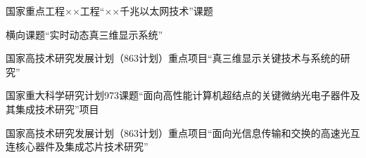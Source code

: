 \begin{resume2}

  \begin{enumerate}[{[}1{]}]
  \addtolength{\itemsep}{-.36\baselineskip}%
  \item 国家重点工程××工程“××千兆以太网技术”课题
  \item 横向课题“实时动态真三维显示系统”
  \item 国家高技术研究发展计划（863计划）重点项目“真三维显示关键技术与系统的研究”
  \item 国家重大科学研究计划973课题“面向高性能计算机超结点的关键微纳光电子器件及其集成技术研究”项目
  \item 国家高技术研究发展计划（863计划）重点项目“面向光信息传输和交换的高速光互连核心器件及集成芯片技术研究”

  \end{enumerate}

\end{resume2}
